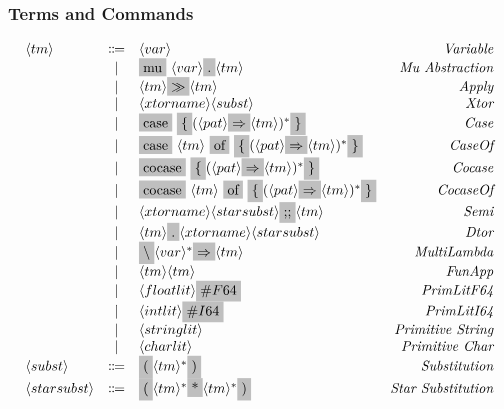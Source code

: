 \documentclass[11pt]{article}
\newcommand{\nonterminal}[1]{\langle #1 \rangle}
\newcommand{\terminal}[1]{\colorbox{lightgray}{\vphantom{X}#1}}
\begin{document}
\subsubsection{Terms and Commands}
\[
  \begin{array}{lclr}
    \nonterminal{tm} & \Coloneqq & \nonterminal{var} & \emph{Variable} \\
    & | & \terminal{mu}\ \nonterminal{var} \terminal{.} \nonterminal{tm} & \textit{Mu Abstraction} \\
    & | & \nonterminal{tm} \terminal{$\gg$} \nonterminal{tm} & \textit{Apply} \\
    & | & \nonterminal{xtorname}\nonterminal{subst} & \emph{Xtor} \\
    & | & \terminal{case}\ \terminal{\{} (\nonterminal{pat} \terminal{$\Rightarrow$} \nonterminal{tm})^{\ast} \terminal{\}} & \emph{Case} \\
    & | & \terminal{case}\ \nonterminal{tm}\ \terminal{of}\ \terminal{\{} (\nonterminal{pat} \terminal{$\Rightarrow$} \nonterminal{tm})^{\ast} \terminal{\}} & \emph{CaseOf} \\
    & | & \terminal{cocase}\ \terminal{\{} (\nonterminal{pat} \terminal{$\Rightarrow$} \nonterminal{tm})^{\ast} \terminal{\}} & \emph{Cocase} \\
    & | & \terminal{cocase}\ \nonterminal{tm}\ \terminal{of}\ \terminal{\{} (\nonterminal{pat} \terminal{$\Rightarrow$} \nonterminal{tm})^{\ast} \terminal{\}} & \emph{CocaseOf} \\
    & | & \nonterminal{xtorname}\nonterminal{starsubst}\terminal{;;}\nonterminal{tm} & \emph{Semi} \\
    & | & \nonterminal{tm}\terminal{.}\nonterminal{xtorname}\nonterminal{starsubst} & \emph{Dtor} \\
    & | & \terminal{$\backslash$} \nonterminal{var}^{\ast}\terminal{$\Rightarrow$} \nonterminal{tm} & \emph{MultiLambda} \\
    & | & \nonterminal{tm} \nonterminal{tm} & \emph{FunApp} \\
    & | & \nonterminal{floatlit}\terminal{$\#F64$} & \emph{PrimLitF64} \\
    & | & \nonterminal{intlit}\terminal{$\#I64$} & \emph{PrimLitI64} \\
    & | & \nonterminal{stringlit} & \emph{Primitive String} \\
    & | & \nonterminal{charlit} & \emph{Primitive Char} \\
    \nonterminal{subst} & \Coloneqq & \terminal{(} \nonterminal{tm}^{\ast} \terminal{)} & \emph{Substitution} \\
    \nonterminal{starsubst} & \Coloneqq & \terminal{(} \nonterminal{tm}^{\ast} \terminal{*} \nonterminal{tm}^{\ast} \terminal{)} & \emph{Star Substitution} \\ 
  \end{array}
\]
\end{document}
